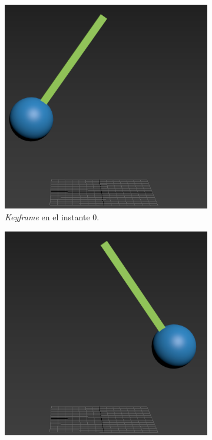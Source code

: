 \documentclass{article}
\begin{document}
\begin{figure}[H]
    \centering
	\begin{subfigure}[H]{0.3\textwidth}
	    \centering
	    \includegraphics[width=\textwidth]{imagenes/Ejercicio 3/pen_0.png}
        \caption{\textit{Keyframe} en el instante 0.}
	\end{subfigure}
    \hfill
	\begin{subfigure}[H]{0.3\textwidth}
	    \centering
	    \includegraphics[width=\textwidth]{imagenes/Ejercicio 3/pen_50.png}

\end{subfigure}
\end{figure}
\end{document}
